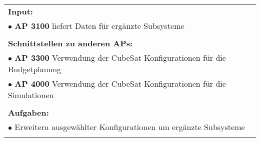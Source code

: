 \begin{table}[!h]
\begin{center}
\begin{tabular}{|p{35mm}||p{55mm}|p{50mm}||p{40mm}|}
   \multicolumn{4}{|p{150mm}|}{\textbf{Input:}}\\
   \multicolumn{4}{|p{150mm}|}{$\bullet$ \textbf{AP 3100} liefert Daten für ergänzte Subsysteme}\\
   \multicolumn{4}{|p{150mm}|}{}\\
   \multicolumn{4}{|p{150mm}|}{\textbf{Schnittstellen zu anderen APs:}}\\
   \multicolumn{4}{|p{150mm}|}{$\bullet$ \textbf{AP 3300} Verwendung der CubeSat Konfigurationen für die Budgetplanung}\\
   \multicolumn{4}{|p{150mm}|}{$\bullet$ \textbf{AP 4000} Verwendung der CubeSat Konfigurationen für die Simulationen}\\
   \multicolumn{4}{|p{150mm}|}{}\\
   \multicolumn{4}{|p{150mm}|}{\textbf{Aufgaben:}}\\
   \multicolumn{4}{|p{150mm}|}{$\bullet$ Erweitern ausgewählter Konfigurationen um ergänzte Subsysteme}\\
	 \multicolumn{4}{|p{150mm}|}{}\\
   \hline
  \end{tabular}
 \end{center}
\end{table}

